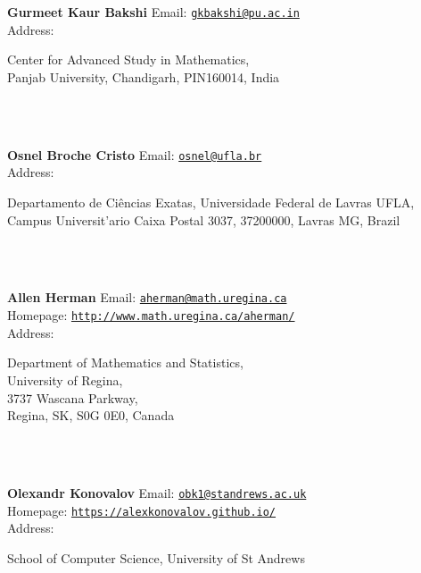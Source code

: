 \documentclass[a4paper,11pt]{report}
\begin{document}
\begin{titlepage}
\mbox{}\\
{\mbox{}\\
\small \noindent \textbf{Gurmeet Kaur Bakshi   }  Email: \href{mailto://gkbakshi@pu.ac.in} {\texttt{gkbakshi@pu.ac.in}}\\
  Address: \begin{minipage}[t]{8cm}\noindent
 Center for Advanced Study in Mathematics, \\
 Panjab University, Chandigarh, PIN\texttt{}160014, India \end{minipage}
}\\
{\mbox{}\\
\small \noindent \textbf{Osnel Broche Cristo   }  Email: \href{mailto://osnel@ufla.br} {\texttt{osnel@ufla.br}}\\
  Address: \begin{minipage}[t]{8cm}\noindent
 Departamento de Ci{\^e}ncias Exatas, Universidade Federal de Lavras
\texttt{} UFLA, Campus Universit{\a'a}rio \texttt{}
Caixa Postal 3037, 37200\texttt{}000, Lavras \texttt{}
MG, Brazil \end{minipage}
}\\
{\mbox{}\\
\small \noindent \textbf{Allen Herman    }  Email: \href{mailto://aherman@math.uregina.ca} {\texttt{aherman@math.uregina.ca}}\\
  Homepage: \href{http://www.math.uregina.ca/~aherman/} {\texttt{http://www.math.uregina.ca/\texttt{}aherman/}}\\
  Address: \begin{minipage}[t]{8cm}\noindent
 Department of Mathematics and Statistics, \\
 University of Regina, \\
 3737 Wascana Parkway, \\
 Regina, SK, S0G 0E0, Canada \end{minipage}
}\\
{\mbox{}\\
\small \noindent \textbf{Olexandr Konovalov    }  Email: \href{mailto://obk1@st-andrews.ac.uk} {\texttt{obk1@st\texttt{}andrews.ac.uk}}\\
  Homepage: \href{https://alex-konovalov.github.io/} {\texttt{https://alex\texttt{}konovalov.github.io/}}\\
  Address: \begin{minipage}[t]{8cm}\noindent
 School of Computer Science, University of St Andrews\\

\end{minipage}}
\end{titlepage}
\end{document}
